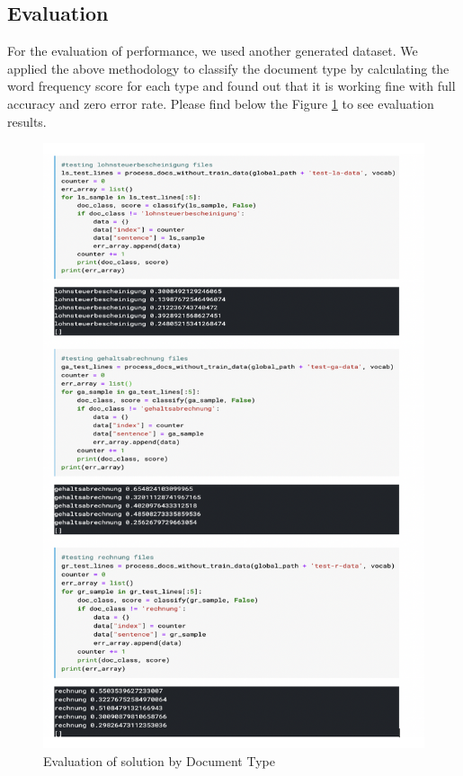 \subsection{Evaluation}
For the evaluation of performance, we used another generated dataset. We applied the above methodology to classify the document type by calculating the word frequency score for each type and found out that it is working fine with full accuracy and zero error rate. Please find below the Figure \ref{sol1_eval} to see evaluation results.
\begin{figure}[H]
\centering
\includegraphics[scale=0.7]{images/Chapter5/sol_1/sol1_eval2.png}
\caption{Evaluation of solution by Document Type}
\label{sol1_eval}
\end{figure}
